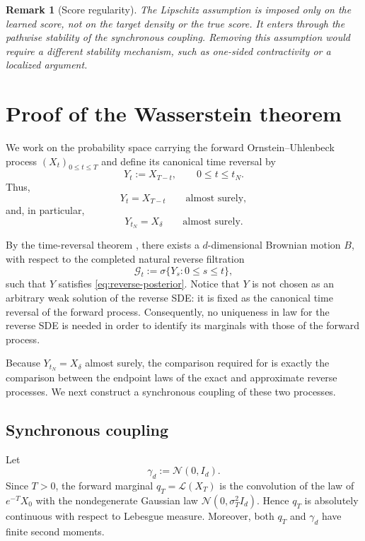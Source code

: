 \documentclass[11pt]{article}
\newtheorem{remark}[theorem]{Remark}
\theoremstyle{definition}
\newcommand{\Law}{\mathcal{L}}
\newcommand{\N}{\mathcal{N}}
\newcommand{\Id}{I_d}
\begin{document}
\begin{remark}[Score regularity]
The Lipschitz assumption is imposed only on the learned score, not on the target density or the true score. It enters through the pathwise stability of the synchronous coupling. Removing this assumption would require a different stability mechanism, such as one-sided contractivity or a localized argument.
\end{remark}

\section{Proof of the Wasserstein theorem}
\label{sec:proof}

We work on the probability space carrying the forward
Ornstein--Uhlenbeck process $(X_t)_{0\le t\le T}$ and define its
canonical time reversal by
\[
    Y_t:=X_{T-t},
    \qquad 0\le t\le t_N.
\]
Thus,
\[
    Y_t=X_{T-t}
    \qquad\text{almost surely},
\]
and, in particular,
\[
    Y_{t_N}=X_\delta
    \qquad\text{almost surely}.
\]

By the time-reversal theorem
\citep{anderson1982reverse,haussmann1986time}, there exists a
$d$-dimensional Brownian motion $B$, with respect to the completed
natural reverse filtration
\[
    \mathcal G_t:=\sigma\{Y_s:0\le s\le t\},
\]
such that $Y$ satisfies \eqref{eq:reverse-posterior}. Notice that
$Y$ is not chosen as an arbitrary weak solution of the reverse SDE:
it is fixed as the canonical time reversal of the forward process.
Consequently, no uniqueness in law for the reverse SDE is needed in
order to identify its marginals with those of the forward process.

Because $Y_{t_N}=X_\delta$ almost surely, the comparison required for
 is exactly the comparison between the endpoint laws of
the exact and approximate reverse processes. We next construct a
synchronous coupling of these two processes.

\subsection{Synchronous coupling}

Let
\[
    \gamma_d:=\N(0,\Id).
\]
Since $T>0$, the forward marginal $q_T=\Law(X_T)$ is the convolution
of the law of $e^{-T}X_0$ with the nondegenerate Gaussian law
$\N(0,\sigma_T^2\Id)$. Hence $q_T$ is absolutely continuous with
respect to Lebesgue measure. Moreover, both $q_T$ and $\gamma_d$
have finite second moments.
\end{document}
